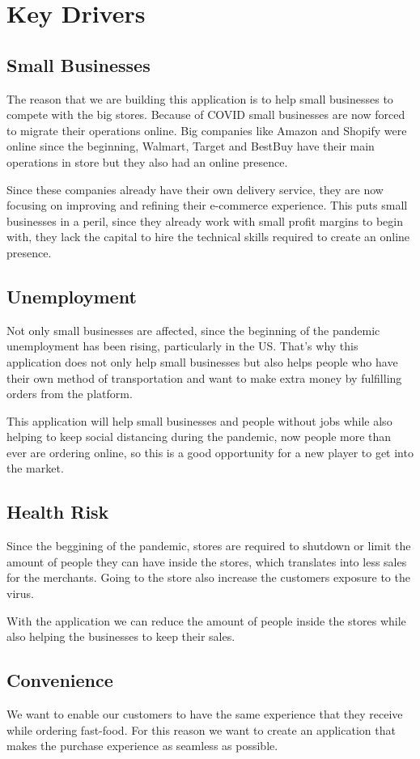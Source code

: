 \section{Key Drivers}
\subsection{Small Businesses}
The reason that we are building this application is to help small 
businesses to compete with the big stores. Because of COVID small businesses 
are now forced to migrate their operations online. Big companies like Amazon 
and Shopify were online since the beginning, Walmart, Target and BestBuy 
have their main operations in store but they also had an online 
presence. \newline

\noindent Since these companies already have their own delivery service, 
they are now focusing on improving and refining their e-commerce experience. 
This puts small businesses in a peril, since they already work with small 
profit margins to begin with, they lack the capital to hire the technical 
skills required to create an online presence. \newline

\subsection{Unemployment}
\noindent Not only small businesses are affected, since the beginning of 
the pandemic unemployment has been rising, particularly in the US. That’s why 
this application does not only help small businesses but also helps people 
who have their own method of transportation and want to make extra money 
by fulfilling orders from the platform.\newline

\noindent This application will help small businesses and people without jobs 
while also helping to keep social distancing during the pandemic, 
now people more than ever are ordering online, so this is a good opportunity 
for a new player to get into the market.

\subsection{Health Risk}
\noindent Since the beggining of the pandemic, stores are required to shutdown 
or limit the amount of people they can have inside the stores, which translates 
into less sales for the merchants. Going to the store also increase the 
customers exposure to the virus. \newline

\noindent With the application we can reduce the amount of people inside the 
stores while also helping the businesses to keep their sales.

\pagebreak

\subsection{Convenience}
\noindent We want to enable our customers to have the same experience that 
they receive while ordering fast-food. For this reason we want to create 
an application that makes the purchase experience as seamless as possible.